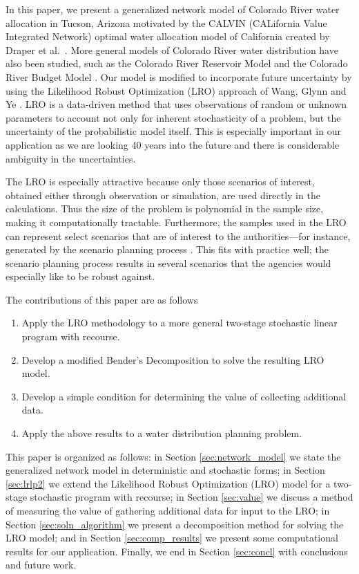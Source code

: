 \documentclass[11pt]{article}
\begin{document}
In this paper, we present a generalized network model of Colorado River water allocation in Tucson, Arizona motivated by the CALVIN (CALifornia Value Integrated Network) optimal water allocation model of California created by Draper et al.\ \cite{draper_etal_03}.
More general models of Colorado River water distribution have also been studied, such as the Colorado River Reservoir Model \cite{christensen2004effects} and the Colorado River Budget Model \cite{barnett2009sustainable}.
Our model is modified to incorporate future uncertainty by using the Likelihood Robust Optimization (LRO) approach of Wang, Glynn and Ye \cite{wang2010likelihood}.
LRO is a data-driven method that uses observations of random or unknown parameters to account not only for inherent stochasticity of a problem, but the uncertainty of the probabilistic model itself.
This is especially important in our application as we are looking 40 years into the future and there is considerable ambiguity in the uncertainties.

The LRO is especially attractive because only those scenarios of interest, obtained either through observation or simulation, are used directly in the calculations.
Thus the size of the problem is polynomial in the sample size, making it computationally tractable.
Furthermore, the samples used in the LRO can represent select scenarios that are of interest to the authorities---for instance, generated by the scenario planning process \cite{cityofTucsonWaterPlan,usbr_11}.
This fits with practice well; the scenario planning process results in several scenarios that the agencies would especially like to be robust against.

The contributions of this paper are as follows
\begin{enumerate}
	\item Apply the LRO methodology to a more general two-stage stochastic linear program with recourse.
	\item Develop a modified Bender's Decomposition to solve the resulting LRO model.
	\item Develop a simple condition for determining the value of collecting additional data.
	\item Apply the above results to a water distribution planning problem.
\end{enumerate}

This paper is organized as follows: in Section \ref{sec:network_model} we state the generalized network model in deterministic and stochastic forms; in Section \ref{sec:lrlp2} we extend the Likelihood Robust Optimization (LRO) model for a two-stage stochastic program with recourse; in Section \ref{sec:value} we discuss a method of measuring the value of gathering additional data for input to the LRO; in Section \ref{sec:soln_algorithm} we present a decomposition method for solving the LRO model; and in Section \ref{sec:comp_results} we present some computational results for our application. Finally, we end in Section \ref{sec:concl} with conclusions and future work.
\end{document}
